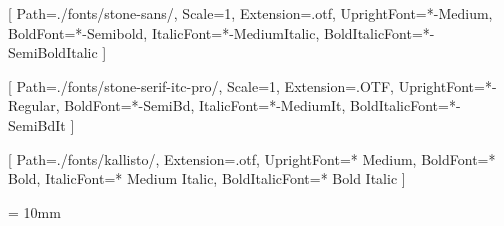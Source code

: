 \usepackage{microtype}
\usepackage{setspace}

\setlength{\parindent}{1em}
\linespread{1.2}

\setstocksize{210mm}{148mm}
\settrimmedsize{210mm}{148mm}{*}
\setbinding{8mm}
\setlrmarginsandblock{10mm}{18mm}{*}
\setulmarginsandblock{22mm}{28mm}{*}

\usepackage{fontspec}

\setsansfont{stone-sans}[
    Path=./fonts/stone-sans/,
    Scale=1,
    Extension=.otf,
    UprightFont=*-Medium,
    BoldFont=*-Semibold,
    ItalicFont=*-MediumItalic,
    BoldItalicFont=*-SemiBoldItalic
]

\setmainfont{stone-serif}[
    Path=./fonts/stone-serif-itc-pro/,
    Scale=1,
    Extension=.OTF,
    UprightFont=*-Regular,
    BoldFont=*-SemiBd,
    ItalicFont=*-MediumIt,
    BoldItalicFont=*-SemiBdIt
]

[
  Path=./fonts/kallisto/,
  Extension=.otf,
  UprightFont=* Medium,
  BoldFont=* Bold,
  ItalicFont=* Medium Italic,
  BoldItalicFont=* Bold Italic
]

\usepackage{lettrine}
\setcounter{DefaultLines}{3}
\renewcommand{\DefaultLoversize}{0.1}
\renewcommand{\DefaultLraise}{0}
\renewcommand{\LettrineTextFont}{}
\setlength{\DefaultFindent}{\fontdimen2\font}
\setlength{\DefaultNindent}{0em}




\nouppercaseheads
\headsep = 10mm
\makeatletter

\pagestyle{mystyle}

